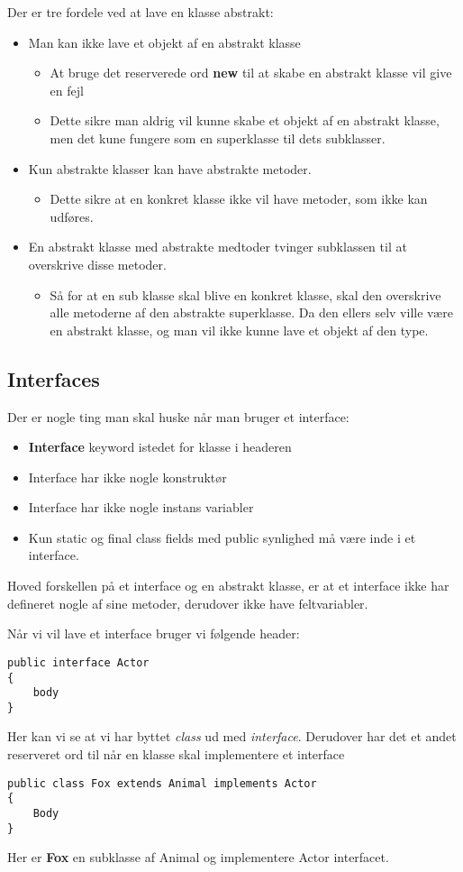 \documentclass{article}
\begin{document}
Der er tre fordele ved at lave en klasse abstrakt:
\begin{itemize}
    \item Man kan ikke lave et objekt af en abstrakt klasse
    \begin{itemize}
        \item At bruge det reserverede ord \textbf{new} til at skabe en abstrakt klasse vil give en fejl
        \item Dette sikre man aldrig vil kunne skabe et objekt af en abstrakt klasse, men det kune fungere som en superklasse til dets subklasser. 
    \end{itemize}
    \item Kun abstrakte klasser kan have abstrakte metoder.
    \begin{itemize}
        \item Dette sikre at en konkret klasse ikke vil have metoder, som ikke kan udføres.
    \end{itemize}
    \item En abstrakt klasse med abstrakte medtoder tvinger subklassen til at overskrive disse metoder.
    \begin{itemize}
        \item Så for at en sub klasse skal blive en konkret klasse, skal den overskrive alle metoderne af den abstrakte superklasse. Da den ellers selv ville være en abstrakt klasse, og man vil ikke kunne lave et objekt af den type.
    \end{itemize}
\end{itemize}

\subsection*{Interfaces}
Der er nogle ting man skal huske når man bruger et interface:
\begin{itemize}
    \item \textbf{Interface} keyword istedet for klasse i headeren
    \item Interface har ikke nogle konstruktør
    \item Interface har ikke nogle instans variabler
    \item Kun static og final class fields med public synlighed må være inde i et interface.
\end{itemize}

Hoved forskellen på et interface og en abstrakt klasse, er at et interface ikke har defineret nogle af sine metoder, derudover ikke have feltvariabler. 

Når vi vil lave et interface bruger vi følgende header:
\begin{verbatim}
public interface Actor
{
    body
}
\end{verbatim}

Her kan vi se at vi har byttet \textit{class} ud med \textit{interface}. Derudover har det et andet reserveret ord til når en klasse skal implementere et interface

\begin{verbatim}
public class Fox extends Animal implements Actor
{
    Body
}
\end{verbatim}

Her er \textbf{Fox} en subklasse af Animal og implementere Actor interfacet. 
\end{document}
